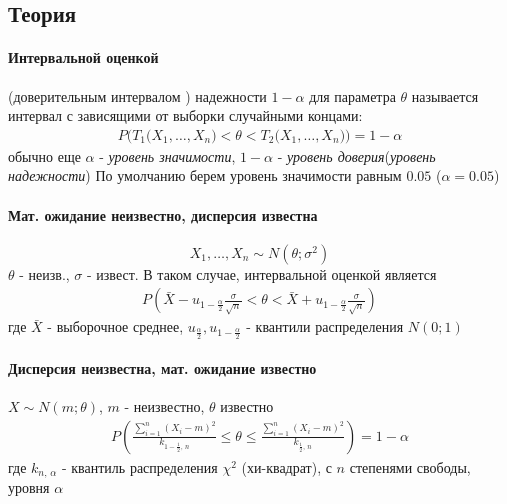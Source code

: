 \documentclass[12pt]{extarticle}
\begin{document}
\subsection*{Теория}
\paragraph{Интервальной оценкой}
(доверительным интервалом ) надежности
$1-\alpha$ для параметра $\theta$ называется интервал с зависящими от выборки
случайными концами:
\begin{eqnarray*}
    P\Big(T_{1}\big(X_{1},\ldots,X_{n}\big)<\theta <
    T_{2}\big(X_{1},\ldots,X_{n}\big)\Big)=1-\alpha
\end{eqnarray*}
обычно еще $\alpha$ - \textit{уровень значимости}, $1-\alpha$ - \textit{уровень доверия}(\textit{уровень
    надежности})  По умолчанию берем уровень значимости равным $0.05$
($\alpha=0.05$)

\paragraph{Мат. ожидание неизвестно, дисперсия известна}

\[X_{1},\ldots,X_{n}\sim N(\theta;\sigma^{2})\]
$\theta$ - неизв., $\sigma$ - извест. В таком случае, интервальной
оценкой является
\begin{eqnarray*}
    P(
    \bar{X}-u_{1-\frac{\alpha}{2}}\frac{\sigma}{\sqrt{n}}
    < \theta <
    \bar{X}+u_{1-\frac{\alpha}{2}}\frac{\sigma}{\sqrt{n}})
\end{eqnarray*}
где $\bar{X}$ - выборочное среднее,
$u_{\frac{\alpha}{2}},u_{1-\frac{\alpha}{2}}$ - квантили
распределения $N(0;1)$

\paragraph{Дисперсия неизвестна, мат. ожидание известно}
$X\sim N(m;\theta)$, $m$ - неизвестно, $\theta$ известно
\begin{eqnarray*}
    P\left(
    \frac{\sum\limits_{i=1}^{n}(X_{i}-m)^{2}}{k_{1-\frac{1}{2},\,n}}
    \leqslant\theta\leqslant
    \frac{\sum\limits_{i=1}^{n}(X_{i}-m)^{2}}{k_{\frac{1}{2},\,n}}
    \right)=1-\alpha
\end{eqnarray*}
где $k_{n,\,\alpha}$ - квантиль распределения $\chi^{2}$ (хи-квадрат),
с $n$ степенями свободы, уровня $\alpha$
\end{document}
